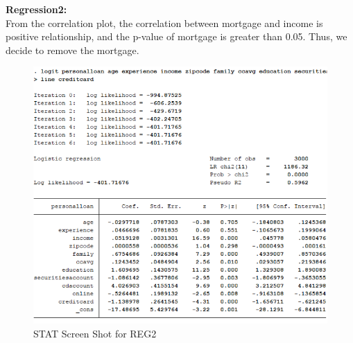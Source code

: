 \documentclass[]{article}
\begin{document}
\textbf{Regression2:}\\
From the correlation plot, the correlation between mortgage and income is positive relationship, and the p-value of mortgage is greater than 0.05. Thus, we decide to remove the mortgage.
\begin{figure}[H]
	\centering
	\includegraphics[width=1\linewidth,height=1\textheight]{tem_files/figure-latex/REG2.pdf}\caption{STAT Screen Shot for REG2}
\end{figure}
\end{document}
